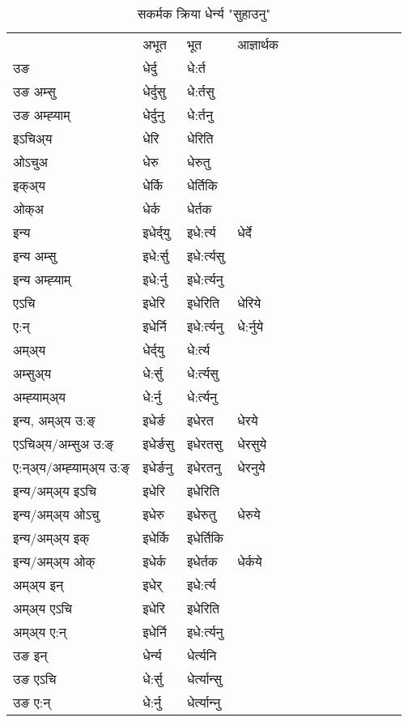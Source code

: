 \begin{table}[H]
\label{ert.vt} \centering
\caption{सकर्मक क्रिया  धेर्न्य  "सुहाउनु"  }
\begin{tabular}{l|l|l|l|l|l|l|l|l|l|l|l|l}  \toprule
&अभूत & भूत & आज्ञार्थक \\ 
उङ &धेर्दु &धे:र्त \\ 
उङ अम्सु&धेर्दुसु &धे:र्तसु \\ 
उङ अम्ह्‍याम्&धेर्दुनु &धे:र्तनु \\ 
इऽचिअ्य &धेरि &धेरिति   \\ 
ओऽचुअ        &धेरु &धेरुतु   \\ 
इक्अ्य&धेर्कि &धेर्तिकि   \\ 
ओक्अ &धेर्क &धेर्तक   \\ 
इन्य & इधेर्द्‌यु  & इधे:र्त्य &धेर्दे  \\ 
इन्य अम्सु& इधे:र्सु  & इधे:र्त्यसु   \\ 
इन्य अम्ह्‍याम्& इधे:र्नु  & इधे:र्त्यनु   \\ 
एऽचि & इधेरि & इधेरिति &धेरिये    \\ 
ए:न् & इधेर्नि  & इधे:र्त्यनु &धे:र्नुये  \\ 
अम्अ्य & धेर्द्‌यु  & धे:र्त्य  \\ 
अम्सुअ्य & धे:र्सु & धे:र्त्यसु  \\ 
अम्ह्‍याम्अ्य & धे:र्नु  & धे:र्त्यनु \\ 
\midrule
इन्य, अम्अ्य उ:ङ्‌ &इधेर्ङ &इधेरत &धेरये \\ 
एऽचिअ्य/अम्सुअ उ:ङ्‌ &इधेर्ङसु &इधेरतसु &धेरसुये \\ 
ए:न्अ्य/अम्ह्‍याम्अ्य उ:ङ्‌ &इधेर्ङनु &इधेरतनु &धेरनुये \\ 
इन्य/अम्अ्य इऽचि &इधेरि &इधेरिति    \\ 
इन्य/अम्अ्य ओऽचु &इधेरु &इधेरुतु  &धेरुये  \\ 
इन्य/अम्अ्य इक् &इधेर्कि &इधेर्तिकि   \\ 
इन्य/अम्अ्य ओक् &इधेर्क &इधेर्तक  &धेर्कये  \\ 
अम्अ्य इन् & इधेर् & इधे:र्त्य   \\ 
अम्अ्य एऽचि & इधेरि & इधेरिति    \\ 
अम्अ्य ए:न् & इधेर्नि  & इधे:र्त्यनु  \\ 
\midrule
उङ इन् & धेर्न्य  & धेर्त्यनि  \\ 
उङ एऽचि & धे:र्सु  & धेर्त्यान्सु   \\ 
उङ ए:न्& धे:र्नु  & धेर्त्यान्‍नु   \\ 
\bottomrule
\end{tabular}
\end{table}


